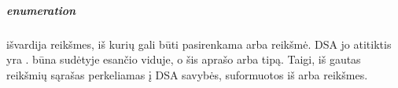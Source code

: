 \documentclass[letterpaper,10pt,lithuanian]{sphinxmanual}
\begin{document}
\subparagraph{enumeration}
\label{\detokenize{schemos/xsd:enumeration}}\label{\detokenize{schemos/xsd:xsd-enumeration}}
\sphinxAtStartPar
{} išvardija reikšmes, iš kurių gali būti pasirenkama {\hyperref[\detokenize{schemos/xsd:xsd-element}]{}} arba 
reikšmė. DSA jo atitiktis yra {\hyperref[\detokenize{dimensijos:enum}]{}}.  būna  sudėtyje esančio
{\hyperref[\detokenize{schemos/xsd:xsd-restriction}]{}} viduje, o šis  aprašo {\hyperref[\detokenize{schemos/xsd:xsd-element}]{}} arba
{\hyperref[\detokenize{schemos/xsd:xsd-attribute}]{}} tipą. Taigi, iš  gautas reikšmių sąrašas perkeliamas
į DSA savybės, suformuotos iš {\hyperref[\detokenize{schemos/xsd:xsd-element}]{}} arba {\hyperref[\detokenize{schemos/xsd:xsd-attribute}]{}} {\hyperref[\detokenize{dimensijos:enum}]{}} reikšmes.
\end{document}
